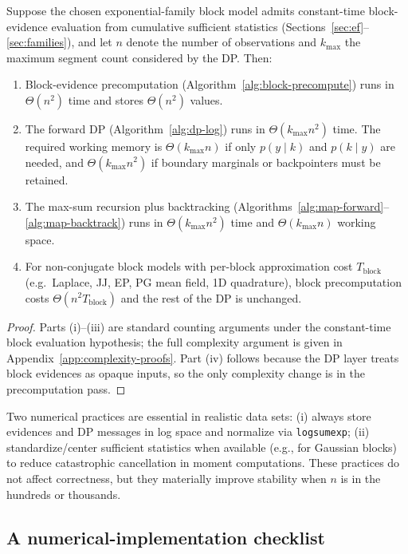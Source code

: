 \begin{proposition}
\label{prop:bb-complexity}
Suppose the chosen exponential-family block model admits constant-time block-evidence evaluation
from cumulative sufficient statistics (Sections~\ref{sec:ef}--\ref{sec:families}), and let
$n$ denote the number of observations and $k_{\max}$ the maximum segment count considered by the
DP. Then:
\begin{enumerate}
\item Block-evidence precomputation (Algorithm~\ref{alg:block-precompute}) runs in $\Theta(n^2)$ time and stores $\Theta(n^2)$ values.
\item The forward DP (Algorithm~\ref{alg:dp-log}) runs in $\Theta(k_{\max}n^2)$ time. The required working memory is $\Theta(k_{\max}n)$ if only $p(y\mid k)$ and $p(k\mid y)$ are needed, and $\Theta(k_{\max}n^2)$ if boundary marginals or backpointers must be retained.
\item The max-sum recursion plus backtracking (Algorithms~\ref{alg:map-forward}--\ref{alg:map-backtrack}) runs in $\Theta(k_{\max}n^2)$ time and $\Theta(k_{\max}n)$ working space.
\item For non-conjugate block models with per-block approximation cost $T_{\mathrm{block}}$ (e.g.\ Laplace, JJ, EP, PG mean field, 1D quadrature), block precomputation costs $\Theta(n^2 T_{\mathrm{block}})$ and the rest of the DP is unchanged.
\end{enumerate}
\end{proposition}

\begin{proof}
Parts (i)--(iii) are standard counting arguments under the constant-time
block evaluation hypothesis; the full complexity argument is given in
Appendix~\ref{app:complexity-proofs}. Part (iv) follows because the DP layer
treats block evidences as opaque inputs, so the only complexity change is in
the precomputation pass.
\end{proof}


Two numerical practices are essential in realistic data sets:
(i) always store evidences and DP messages in log space and normalize via \texttt{logsumexp};
(ii) standardize/center sufficient statistics when available (e.g., for Gaussian blocks) to
reduce catastrophic cancellation in moment computations.
These practices do not affect correctness, but they materially improve stability when $n$ is
in the hundreds or thousands.

\subsection{A numerical-implementation checklist}
\label{sec:alg-checklist}

